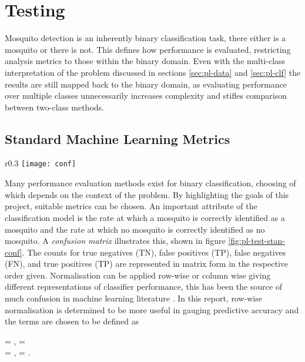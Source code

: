 \section{Testing}
\label{sec:pl-test}
    Mosquito detection is an inherently binary classification task, there either is a mosquito or there is not. This defines how performance is evaluated, restricting analysis metrics to those within the binary domain. Even with the multi-class interpretation of the problem discussed in sections \ref{sec:pl-data} and \ref{sec:pl-clf} the results are still mapped back to the binary domain, as evaluating performance over multiple classes unnecessarily increases complexity and stifles comparison between two-class methods.
    \subsection{Standard Machine Learning Metrics}
    \label{subsec:pl-test-stan}
         \begin{wrapfigure}{r}{0.3\textwidth}
            \centering
            \texttt{[image: conf]}
            \caption{An example confusion matrix of an SVM output.}
            \label{fig:pl-test-stan-conf}
        \end{wrapfigure}
        Many performance evaluation methods exist for binary classification, choosing of which depends on the context of the problem. By highlighting the goals of this project, suitable metrics can be chosen. An important attribute of the classification model is the rate at which a mosquito is correctly identified as a mosquito and the rate at which no mosquito is correctly identified as no mosquito. A \textit{confusion matrix} illustrates this, shown in figure \ref{fig:pl-test-stan-conf}. The counts for true negatives (TN), false positives (TP), false negatives (FN), and true positives (TP) are represented in matrix form in the respective order given. Normalisation can be applied row-wise or column wise giving different representations of classifier performance, this has been the source of much confusion in machine learning literature \cite{Gambino2006}. In this report, row-wise normalisation is determined to be more useful in gauging predictive accuracy and the terms are chosen to be defined as
        \begin{tgather}
            \footnotesize{} = ,  = \\
            \footnotesize{} = ,  = .
        \end{tgather}
        
